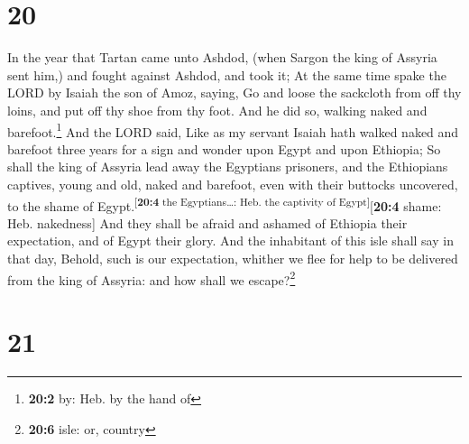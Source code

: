 \hypertarget{section-19}{%
\section{20}\label{section-19}}

 In the year that Tartan came unto Ashdod, (when Sargon
the king of Assyria sent him,) and fought against Ashdod, and took it;
 At the same time spake the LORD by Isaiah the son of
Amoz, saying, Go and loose the sackcloth from off thy loins, and put off
thy shoe from thy foot. And he did so, walking naked and
barefoot.\footnote{\textbf{20:2} by: Heb. by the hand of} 
And the LORD said, Like as my servant Isaiah hath walked naked and
barefoot three years for a sign and wonder upon Egypt and upon Ethiopia;
 So shall the king of Assyria lead away the Egyptians
prisoners, and the Ethiopians captives, young and old, naked and
barefoot, even with their buttocks uncovered, to the shame of
Egypt.\textsuperscript{{[}\textbf{20:4} the Egyptians\ldots: Heb. the
captivity of Egypt{]}}{[}\textbf{20:4} shame: Heb. nakedness{]}
 And they shall be afraid and ashamed of Ethiopia their
expectation, and of Egypt their glory.  And the inhabitant
of this isle shall say in that day, Behold, such is our expectation,
whither we flee for help to be delivered from the king of Assyria: and
how shall we escape?\footnote{\textbf{20:6} isle: or, country}

\hypertarget{section-20}{%
\section{21}\label{section-20}}

